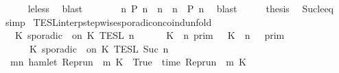 \begin{isabellebody}
\ \ \ \ \isamarkupfalse%
\ le{\isacharunderscore}less\ \isamarkupfalse%
\ blast\isanewline
\ \ \isamarkupfalse%
\ \isamarkupfalse%
\ {\isacartoucheopen}{\isachardot}{\isachardot}{\isachardot}\ {\isacharequal}\ {\isacharparenleft}{\isasymexists}n{\isachardot}\ {\isacharparenleft}P\ n\ {\isasymor}\ {\isacharparenleft}n\ {\isachargreater}\ n\ {\isasymand}\ P\ n{\isacharparenright}{\isacharparenright}{\isacartoucheclose}\ \isamarkupfalse%
\ blast\isanewline
\ \ \isamarkupfalse%
\ \isamarkupfalse%
\ {\isacharquery}thesis\ \isamarkupfalse%
\ Suc{\isacharunderscore}le{\isacharunderscore}eq\ \isamarkupfalse%
\ simp\isanewline
{}\isamarkupfalse%
%
\endisatagproof
{\isafoldproof}%
%
\isadelimproof
%
\endisadelimproof
%
\isadelimdocument
%
\endisadelimdocument
%
\isatagdocument
%
\isamarkuptrue%
%
\endisatagdocument
{\isafolddocument}%
%
\isadelimdocument
%
\endisadelimdocument
{}\isamarkupfalse%
\ TESL{\isacharunderscore}interp{\isacharunderscore}stepwise{\isacharunderscore}sporadicon{\isacharunderscore}coind{\isacharunderscore}unfold{\isacharcolon}\isanewline
\ \ {\isacartoucheopen}{\isasymlbrakk}\ K\ sporadic\ {\isasymtau}\ on\ K\ {\isasymrbrakk}\isactrlsub T\isactrlsub E\isactrlsub S\isactrlsub L\isactrlbsup {\isasymge}\ n\isactrlesup \ {\isacharequal}\isanewline
\ \ \ \ {\isasymlbrakk}\ K\ {\isasymUp}\ n\ {\isasymrbrakk}\isactrlsub p\isactrlsub r\isactrlsub i\isactrlsub m\ {\isasyminter}\ {\isasymlbrakk}\ K\ {\isasymDown}\ n\ {\isacharat}\ {\isasymtau}\ {\isasymrbrakk}\isactrlsub p\isactrlsub r\isactrlsub i\isactrlsub m\isanewline
\ \ \ \ {\isasymunion}\ {\isasymlbrakk}\ K\ sporadic\ {\isasymtau}\ on\ K\ {\isasymrbrakk}\isactrlsub T\isactrlsub E\isactrlsub S\isactrlsub L\isactrlbsup {\isasymge}\ Suc\ n\isactrlesup {\isacartoucheclose}\isanewline
%
\isadelimproof
%
\endisadelimproof
%
\isatagproof
{}\isamarkupfalse%
\ {\isacharminus}\isanewline
\ \ \isamarkupfalse%
\ {\isacartoucheopen}{\isacharbraceleft}{\isasymrho}{\isachardot}\ {\isasymexists}m{\isasymge}n{\isachardot}\ hamlet\ {\isacharparenleft}{\isacharparenleft}Rep{\isacharunderscore}run\ {\isasymrho}{\isacharparenright}\ m\ K\ {\isacharequal}\ True\ {\isasymand}\ time\ {\isacharparenleft}{\isacharparenleft}Rep{\isacharunderscore}run\ {\isasymrho}{\isacharparenright}\ m\ K\ {\isacharequal}\ {\isasymtau}{\isacharbraceright}\isanewline

\end{isabellebody}
